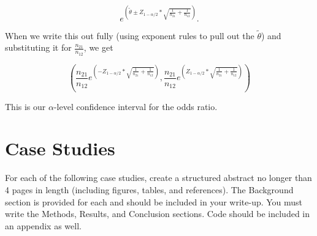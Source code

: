 \documentclass{article}
\begin{document}
	$$e^{\left( \tilde{\theta} \pm Z_{1 - \alpha/2} * \sqrt{\frac{1}{n_{21}} + \frac{1}{n_{12}}} \right)}.$$

	When we write this out fully (using exponent rules to pull out the $\tilde{\theta}$) and substituting it for $\frac{n_{21}}{n_{12}}$, we get

	$$\left( \frac{n_{21}}{n_{12}} e^{\left( -Z_{1 - \alpha / 2} * \sqrt{\frac{1}{n_{21}} + \frac{1}{n_{12}}} \right)}, \frac{n_{21}}{n_{12}} e^{\left(Z_{1 - \alpha / 2} * \sqrt{\frac{1}{n_{21}} + \frac{1}{n_{12}}} \right)} \right) $$

	This is our $\alpha$-level confidence interval for the odds ratio.

	\section*{Case Studies}
	For each of the following case studies, create a structured abstract no longer than 4 pages in length (including figures, tables, and references). The Background section is provided for each and should be included in your write-up. You must write the Methods, Results, and Conclusion sections. Code should be included in an appendix as well.
\end{document}
